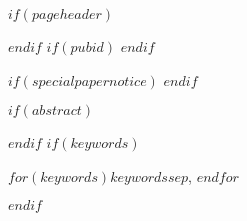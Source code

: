 
$if(pageheader)$
$endif$
$if(pubid)$
$endif$

$if(specialpapernotice)$
$endif$

\maketitle

$if(abstract)$
\begin{abstract}
$abstract$
\end{abstract}
$endif$
$if(keywords)$
\begin{IEEEkeywords}
$for(keywords)$$keywords$$sep$, $endfor$
\end{IEEEkeywords}
$endif$

%


